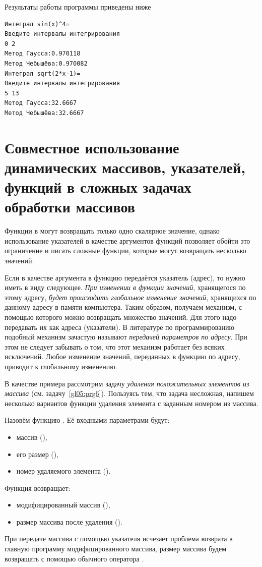 Результаты работы программы приведены ниже
\begin{verbatim}
Интеграл sin(x)^4= 
Введите интервалы интегрирования 
0 2 
Метод Гаусса:0.970118 
Метод Чебышёва:0.970082 
Интеграл sqrt(2*x-1)= 
Введите интервалы интегрирования 
5 13 
Метод Гаусса:32.6667 
Метод Чебышёва:32.6667
\end{verbatim}

\section[Совместное использование динамических массивов]{Совместное использование динамических массивов, указателей, функций в сложных задачах обработки массивов}
Функции в  могут возвращать только одно скалярное значение, однако использование указателей в качестве аргументов
функций позволяет обойти это ограничение и писать сложные функции, которые могут возвращать несколько значений.

Если в качестве аргумента в функцию передаётся указатель (адрес), то нужно иметь в виду следующее. \emph{При
изменении в функции значений}, хранящегося по этому адресу, \emph{будет происходить глобальное изменение значений},
хранящихся по данному адресу в памяти компьютера. Таким образом, получаем механизм, с помощью которого можно возвращать
множество значений. Для этого надо передавать их как адреса (указатели). В литературе по программированию
подобный механизм зачастую называют \emph{передачей параметров по адресу}. При этом не следует забывать о том, что
этот механизм работает без всяких исключений. Любое изменение значений, переданных в функцию по адресу, приводит к
глобальному изменению.

В качестве примера рассмотрим задачу \emph{удаления положительных элементов из массива} (см. задачу~\ref{gl05:prg6}).
Пользуясь тем, что задача несложная, напишем несколько вариантов функции удаления элемента с заданным номером из
массива.

Назовём функцию . Её входными параметрами будут:

\begin{itemize}
\item массив (),
\item его размер (),
\item номер удаляемого элемента ().
\end{itemize}
Функция возвращает:

\begin{itemize}
\item модифицированный массив (),
\item размер массива после удаления ().
\end{itemize}
При передаче массива с помощью указателя исчезает проблема возврата в главную программу модифицированного массива,
размер массива будем возвращать с помощью обычного оператора .

